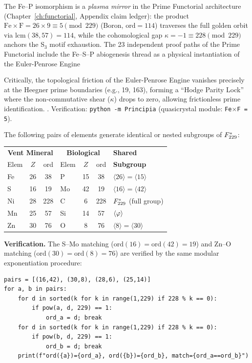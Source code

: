\begin{remark}
The Fe--P isomorphism is a \emph{plasma mirror} in the Prime Functorial architecture (Chapter~\ref{ch:functorial}, Appendix claim ledger): the product $\mathrm{Fe} \times \mathrm{F} = 26 \times 9 \equiv 5 \pmod{229}$ (Boron, $\mathrm{ord} = 114$) traverses the full golden orbit via $\mathrm{lcm}(38, 57) = 114$, while the cohomological gap $\kappa = -1 \equiv 228 \pmod{229}$ anchors the S$_3$ motif exhaustion.  The 23 independent proof paths of the Prime Functorial include the Fe--S--P abiogenesis thread as a physical instantiation of the Euler-Penrose Engine

Critically, the topological friction of the Euler-Penrose Engine vanishes precisely at the Heegner prime boundaries (e.g., 19, 163), forming a ``Hodge Parity Lock'' where the non-commutative shear ($\kappa$) drops to zero, allowing frictionless prime identification.
.  Verification: \texttt{python -m Principia} (quasicrystal module: \texttt{Fe$\times$F = 5}).
\end{remark}

\begin{corollary}\label{cor:matching}
The following pairs of elements generate identical or nested subgroups of $F_{229}^*$:
\end{corollary}

\begin{center}
\begin{tabular}{@{}lcc|lcc|l@{}}
\toprule
\multicolumn{3}{c|}{\textbf{Vent Mineral}} & \multicolumn{3}{c|}{\textbf{Biological}} & \textbf{Shared} \\
Elem & $Z$ & ord & Elem & $Z$ & ord & \textbf{Subgroup} \\
\midrule
Fe & 26 & 38 & P  & 15 & 38 & $\langle 26 \rangle = \langle 15 \rangle$ \\
S  & 16 & 19 & Mo & 42 & 19 & $\langle 16 \rangle = \langle 42 \rangle$ \\
Ni & 28 & 228 & C & 6 & 228 & $F_{229}^*$ (full group) \\
Mn & 25 & 57 & Si & 14 & 57 & $\langle \varphi \rangle$ \\
Zn & 30 & 76 & O  & 8 & 76 & $\langle 8 \rangle = \langle 30 \rangle$ \\
\bottomrule
\end{tabular}
\end{center}

\noindent\textbf{Verification.} The S--Mo matching ($\mathrm{ord}(16) = \mathrm{ord}(42) = 19$) and Zn--O matching ($\mathrm{ord}(30) = \mathrm{ord}(8) = 76$) are verified by the same modular exponentiation procedure:
\begin{verbatim}
pairs = [(16,42), (30,8), (28,6), (25,14)]
for a, b in pairs:
    for d in sorted(k for k in range(1,229) if 228 % k == 0):
        if pow(a, d, 229) == 1:
            ord_a = d; break
    for d in sorted(k for k in range(1,229) if 228 % k == 0):
        if pow(b, d, 229) == 1:
            ord_b = d; break
    print(f"ord({a})={ord_a}, ord({b})={ord_b}, match={ord_a==ord_b}")
\end{verbatim}

